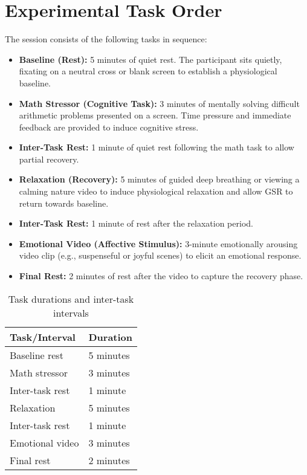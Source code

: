 \documentclass{article}
\begin{document}
\section{Experimental Task Order}
The session consists of the following tasks in sequence:
\begin{itemize}
    \item \textbf{Baseline (Rest):} 5 minutes of quiet rest. The participant sits quietly, fixating on a neutral cross or blank screen to establish a physiological baseline.
    \item \textbf{Math Stressor (Cognitive Task):} 3 minutes of mentally solving difficult arithmetic problems presented on a screen. Time pressure and immediate feedback are provided to induce cognitive stress.
    \item \textbf{Inter-Task Rest:} 1 minute of quiet rest following the math task to allow partial recovery.
    \item \textbf{Relaxation (Recovery):} 5 minutes of guided deep breathing or viewing a calming nature video to induce physiological relaxation and allow GSR to return towards baseline.
    \item \textbf{Inter-Task Rest:} 1 minute of rest after the relaxation period.
    \item \textbf{Emotional Video (Affective Stimulus):} 3-minute emotionally arousing video clip (e.g., suspenseful or joyful scenes) to elicit an emotional response.
    \item \textbf{Final Rest:} 2 minutes of rest after the video to capture the recovery phase.
\end{itemize}

\begin{table}[h]
    \centering
    \caption{Task durations and inter-task intervals}
    \begin{tabular}{ll}
        \hline
        Task/Interval   & Duration  \\
        \hline
        Baseline rest   & 5 minutes \\
        Math stressor   & 3 minutes \\
        Inter-task rest & 1 minute  \\
        Relaxation      & 5 minutes \\
        Inter-task rest & 1 minute  \\
        Emotional video & 3 minutes \\
        Final rest      & 2 minutes \\
        \hline
    \end{tabular}
\end{table}
\end{document}

